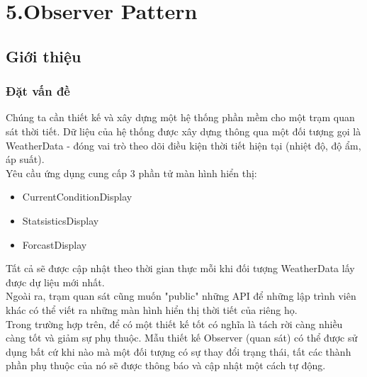 \chapter{5.Observer Pattern}

\section{Giới thiệu}
\subsection{Đặt vấn đề}
Chúng ta cần thiết kế và xây dựng một hệ thống phần mềm cho một trạm quan sát thời tiết. Dữ liệu của hệ thống được xây dựng thông qua một đối tượng gọi là WeatherData - đóng vai trò theo dõi điều kiện thời tiết hiện tại (nhiệt độ, độ ẩm, áp suất).\\
Yêu cầu ứng dụng cung cấp 3 phần tử màn hình hiển thị:
\begin{itemize}
    \item CurrentConditionDisplay
    \item StatsisticsDisplay
    \item ForcastDisplay
\end{itemize}
Tất cả sẽ được cập nhật theo thời gian thực mỗi khi đối tượng WeatherData lấy được dự liệu mới nhất.\\
Ngoài ra, trạm quan sát cũng muốn "public" những API để những lập trình viên khác có thể viết ra những màn hình hiển thị thời tiết của riêng họ.\\
Trong trường hợp trên, để có một thiết kế tốt có nghĩa là tách rời càng nhiều càng tốt và giảm sự phụ thuộc. Mẫu thiết kế Observer (quan sát) có thể được sử dụng bất cứ khi nào mà một đối tượng có sự thay đổi trạng thái, tất các thành phần phụ thuộc của nó sẽ được thông báo và cập nhật một cách tự động.

